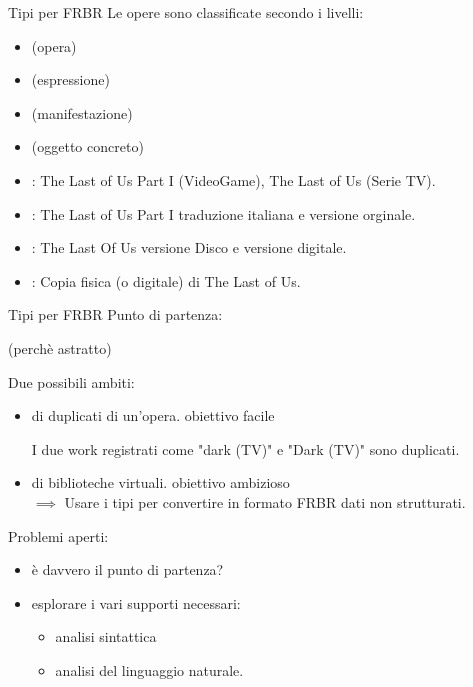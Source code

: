 \begin{frame}{Tipi per FRBR}
Le opere sono classificate secondo i livelli:
\begin{itemize}
    \item {} (opera)
    \item {} (espressione)
    \item {} (manifestazione)
    \item {} (oggetto concreto)
\end{itemize}
\begin{example}
\begin{itemize}
    \item {}: The Last of Us Part I (VideoGame), The Last of Us (Serie TV).
    \item {}: The Last of Us Part I traduzione italiana e versione orginale.
    \item {}: The Last Of Us versione Disco e versione digitale.
    \item {}: Copia fisica (o digitale) di The Last of Us.
\end{itemize}
\end{example}
\end{frame}

\begin{frame}{Tipi per FRBR}
	Punto di partenza:
	\begin{center}
		 (perchè astratto)
	\end{center}
    Due possibili ambiti:
    \begin{itemize}
     \item {} di duplicati di un'opera.\hfill{\color{green} obiettivo facile}
     \begin{example}
     	I due work registrati come "dark (TV)" e "Dark (TV)" sono duplicati.
     \end{example}
     \item {} di biblioteche virtuali.\hfill{\color{magenta} obiettivo ambizioso}\\
     $\implies$ Usare i tipi per convertire in formato FRBR dati non strutturati.
    \end{itemize}
    Problemi aperti:
    \begin{itemize}
        \item \`e davvero  il punto di partenza?
        \item esplorare i vari supporti necessari:
        \begin{itemize}
        	\item analisi sintattica
        	\item analisi del linguaggio naturale.
        \end{itemize}
    \end{itemize}
\end{frame}

